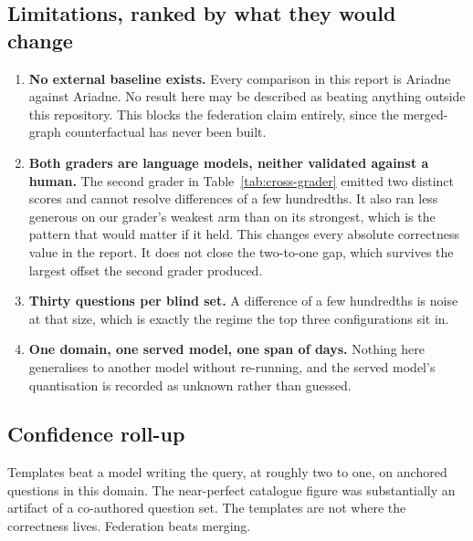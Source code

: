 \subsection{Limitations, ranked by what they would change}

\begin{enumerate}
  \item \textbf{No external baseline exists.} Every comparison in this report is
    Ariadne against Ariadne. No result here may be described as beating anything
    outside this repository. This blocks the federation claim entirely, since
    the merged-graph counterfactual has never been built.
  \item \textbf{Both graders are language models, neither validated against a
    human.} The second grader in Table~\ref{tab:cross-grader} emitted two
    distinct scores and cannot resolve differences of a few hundredths. It also
    ran less generous on our grader's weakest arm than on its strongest, which
    is the pattern that would matter if it held. This changes every absolute
    correctness value in the report. It does not close the two-to-one gap, which
    survives the largest offset the second grader produced.
  \item \textbf{Thirty questions per blind set.} A difference of a few
    hundredths is noise at that size, which is exactly the regime the top three
    configurations sit in.
  \item \textbf{One domain, one served model, one span of days.} Nothing here
    generalises to another model without re-running, and the served model's
    quantisation is recorded as unknown rather than guessed.
\end{enumerate}

\subsection{Confidence roll-up}

Templates beat a model writing the query, at roughly two to one, on anchored
questions in this domain.  The near-perfect catalogue figure
was substantially an artifact of a co-authored question set.
 The templates are not where the correctness lives.
 Federation beats merging. 
